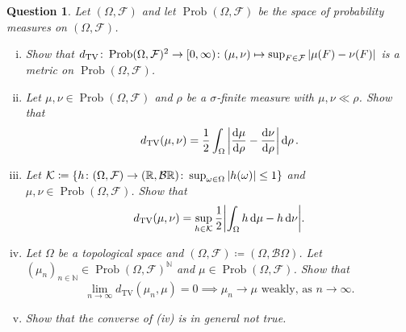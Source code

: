 \documentclass{article}
\theoremstyle{plain}
\newtheorem{question}{Question}
\theoremstyle{remark}
\newcommand{\Bb}{\mathbb}
\newcommand{\Cal}{\mathcal}
\newcommand{\Rm}{\mathrm}
\newcommand{\NN}{\Bb N}
\newcommand{\RR}{\Bb R}
\newcommand\ceq\coloneqq %
\newcommand\KK{\Cal K}
\newcommand\BB{\Cal B}
\newcommand\FF{\Cal F}
\DeclareMathOperator\TV{TV}
\DeclareMathOperator\Prob{Prob}
\begin{document}
\begin{question}
	Let $(\Omega, \FF)$ and let $\Prob(\Omega, \FF)$ be the space of probability measures on $(\Omega, \FF)$. 
	\begin{enumerate}[(i)]
		\item Show that $d_{\TV} \colon \Prob(\Omega, \FF)^2 \to [0, \infty) \colon (\mu, \nu) \mapsto \sup_{F \in \FF} \abs{\mu(F) - \nu(F)}$ is a metric on $\Prob(\Omega, \FF)$. 
		
		\item Let $\mu, \nu \in \Prob(\Omega, \FF)$ and $\rho$ be a $\sigma$-finite measure with $\mu, \nu \ll\rho$. Show that
		\[
		d_{\TV} (\mu, \nu) = \frac12\int_\Omega \abs{\dv{\mu}{\rho} - \dv{\nu}{\rho}} \dd{\rho}. 
		\]
		
		\item Let $\KK \ceq \qty{h \colon (\Omega, \FF) \to (\RR, \BB\RR) \colon \sup_{\omega \in \Omega} \abs{h(\omega)} \leq 1}$ and $\mu, \nu \in \Prob(\Omega, \FF)$. Show that
		\[
		d_\Rm{TV}(\mu, \nu) = \sup_{h \in \KK} \frac12 \abs{\int_\Omega h \dd{\mu} - h\dd{\nu}}. 
		\]
		
		\item Let $\Omega$ be a topological space and $(\Omega, \FF) \ceq (\Omega, \BB\Omega)$. Let $(\mu_n)_{n\in\NN} \in \Prob(\Omega, \FF)^\NN$ and $\mu \in \Prob(\Omega, \FF)$. Show that 
		\[
		\lim_{n\to\infty} d_\Rm{TV}(\mu_n, \mu) = 0 \implies \mu_n \to \mu \text{ weakly, as } n \to\infty. 
		\]
		
		\item Show that the converse of (iv) is in general not true. 
	\end{enumerate}
\end{question}
\end{document}
